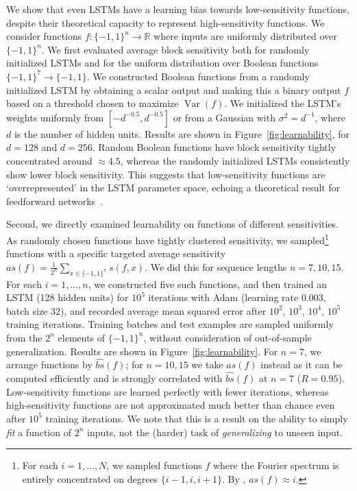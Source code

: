 \documentclass[11pt,a4paper]{article}
\newcommand{\E}{\mathop{\mathbb{E}}}%
\begin{document}
We show that even LSTMs have a learning bias towards low-sensitivity functions, despite their theoretical capacity to represent high-sensitivity functions.
We consider functions  $f : \{-1,1\}^n \rightarrow \mathbb{R}$ where inputs are uniformly distributed over $\{-1,1\}^n$. %
We first evaluated average block sensitivity both for randomly initialized LSTMs and for the uniform distribution over Boolean functions $\{-1,1\}^7 \rightarrow \{-1,1\}$. %
We constructed Boolean functions from a randomly initialized LSTM by obtaining a scalar output and making this a binary output $f$ based on a threshold chosen to maximize $\operatorname{Var}(f)$.
We initialized the LSTM's weights uniformly from $[-d^{-0.5}, d^{-0.5}]$ or from a Gaussian with $\sigma^2 = d^{-1}$, where $d$ is the number of hidden units.
Results are shown in Figure~\ref{fig:learnability}, for $d=128$ and $d=256$.
Random Boolean functions have block sensitivity tightly concentrated around $\approx 4.5$, whereas the randomly initialized LSTMs consistently show lower block sensitivity.
This suggests that low-sensitivity functions are `overrepresented' in the LSTM parameter space, echoing a theoretical result for feedforward networks~\citep{de2018deep}.

Second, we directly examined learnability on functions of different sensitivities.
As randomly chosen functions have tightly clustered sensitivity, we sampled\footnote{For each $i = 1, \dots, N$, we sampled functions $f$ where the Fourier spectrum is entirely concentrated on degrees $\{i-1, i, i+1\}$. By \citet[Thm. 2.38]{odonnell2014analysis}, $as(f) \approx i$.} functions with a specific targeted average sensitivity $as(f) = \frac{1}{2^{n}} \sum_{x\in\{-1,1\}^n} s(f,x)$.
We did this for sequence lengths $n=7,10,15$.
For each $i=1, \dots, n$, we constructed five such functions, and then trained an LSTM (128 hidden units) for $10^5$ iterations with Adam (learning rate $0.003$, batch size $32$), and recorded average mean squared error after $10^2$, $10^3$, $10^4$, $10^5$ training iterations.
Training batches and test examples are sampled uniformly from the $2^n$ elements of $\{-1,1\}^n$, without consideration of out-of-sample generalization.
Results are shown in Figure~\ref{fig:learnability}.
For $n=7$, we arrange functions by $\widehat{bs}(f)$; for $n=10, 15$ we take $as(f)$ instead as it can be computed efficiently and is strongly correlated with $\widehat{bs}(f)$ at $n=7$ ($R = 0.95$).
Low-sensitivity functions are learned perfectly with fewer iterations, whereas high-sensitivity functions are not approximated much better than chance even after $10^5$ training iterations.
We note that this is a result on the ability to simply \emph{fit} a function of $2^n$ inputs, not the (harder) task of \emph{generalizing} to unseen input.
\end{document}
